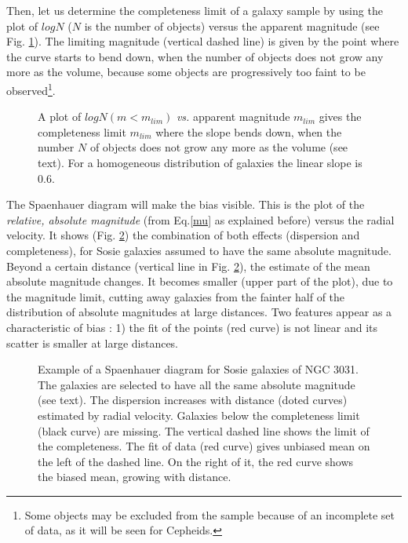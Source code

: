 Then, let us determine the completeness limit of a galaxy sample by using the plot of $logN$  ($N$ is the number of objects) versus the apparent magnitude (see Fig.  \ref{complet}). The limiting magnitude (vertical dashed line) is given by the point where the curve starts to bend down, when the number of objects does not grow any more as the volume, because some objects are progressively too faint to be observed\footnote{Some objects may be excluded from the sample because of an incomplete set of data, as it will be seen for Cepheids.}.
 
\begin{figure}
\caption{A plot of $logN(m<m_{lim})$ {\it{vs.}} apparent magnitude $m_{lim}$ gives the completeness limit $m_{lim}$ where the slope bends down, when the number $N$ of objects does not grow any more as the volume (see text). For a homogeneous distribution of galaxies the linear slope is $0.6$.}
\label{complet}    
\end{figure}

The Spaenhauer diagram \cite{spaenh} will make the bias visible.
This is the plot of the {\it{relative, absolute magnitude}} (from Eq.\ref{mu} as explained before) versus the radial velocity.
It shows  (Fig. \ref{spaen}) the combination of both effects (dispersion and completeness), for Sosie galaxies assumed to have the same absolute magnitude.  Beyond a certain distance (vertical line in Fig. \ref{spaen}), the estimate of the mean absolute magnitude changes. It becomes smaller (upper part of the plot), due to the magnitude limit, cutting away galaxies from the fainter half of the distribution of absolute magnitudes at large distances. Two features appear as a characteristic of bias : 1) the fit of the points (red curve) is not linear and its scatter is smaller at large distances.

\begin{figure}
\caption{ Example of a  Spaenhauer diagram for Sosie galaxies of NGC 3031. The galaxies are selected to have all the same absolute magnitude (see text). The dispersion increases with distance (doted curves) estimated by radial velocity. Galaxies below the completeness limit (black curve) are missing. The vertical dashed line shows the limit of the completeness. The fit of data (red curve) gives unbiased mean on the left of  the dashed line. On the right of it, the red curve shows the biased mean, growing with distance. }
\label{spaen}    
\end{figure}

